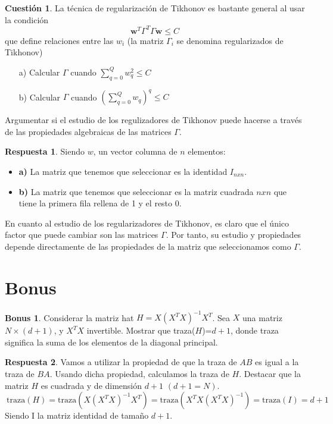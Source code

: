 \documentclass[10pt,a4paper]{article}
\theoremstyle{definition}
\newtheorem{cuestion}{Cuestión}
\newtheorem*{bonus}{Bonus}
\newtheorem*{respuesta}{Respuesta}
\begin{document}
\begin{cuestion}
La técnica de regularización de Tikhonov es bastante general al usar la condición
\[		\mathbf{w}^T\Gamma^T\Gamma\mathbf{w} \leq C		\]
que define relaciones entre las $w_i$ (la matriz $\Gamma_i$ se denomina regularizados de Tikhonov)
\begin{enumerate}
\item[a)] Calcular $\Gamma$ cuando $\sum_{q=0}^Qw_q^2 \leq C$
\item[b)] Calcular $\Gamma$ cuando $(\sum_{q=0}^Qw_q)^q \leq C$
\end{enumerate}
Argumentar si el estudio de los regulizadores de Tikhonov puede hacerse a través de las propiedades algebraicas de las matrices $\Gamma$.
\end{cuestion}
\begin{respuesta}
Siendo $w$, un vector columna de $n$ elementos:
\begin{itemize}
\item \textbf{a)} La matriz que tenemos que seleccionar es la identidad $I_{nxn}$.
\item \textbf{b)} La matriz que tenemos que seleccionar es la matriz cuadrada $nxn$ que tiene la primera fila rellena de 1 y el resto 0.
\end{itemize}

En cuanto al estudio de los regularizadores de Tikhonov, es claro que el único factor que puede cambiar son las matrices $\Gamma$. Por tanto, su estudio y propiedades depende directamente de las propiedades de la matriz que seleccionamos como $\Gamma$.\\
\end{respuesta}
\section*{Bonus}
\begin{bonus}
Considerar la matriz hat $H=X(X^TX)^{-1}X^T$. Sea $X$ una matriz $N \times (d+1)$, y $X^TX$ invertible. Mostrar que traza($H$)=$d+1$, donde traza significa la suma de los elementos de la diagonal principal.
\end{bonus}
\begin{respuesta}
Vamos a utilizar la propiedad de que la traza de $AB$ es igual a la traza de $BA$. Usando dicha propiedad, calculamos la traza de $H$. Destacar que la matriz $H$ es cuadrada y de dimensión $d+1$ $(d+1=N)$.
\[
\ \textrm{traza}(H) = \textrm{traza}(X(X^TX)^{-1}X^T) = \textrm{traza}(X^TX(X^TX)^{-1}) = \textrm{traza}(I) = d+1
\]
Siendo I la matriz identidad de tamaño $d+1$.
\end{respuesta}
\end{document}
